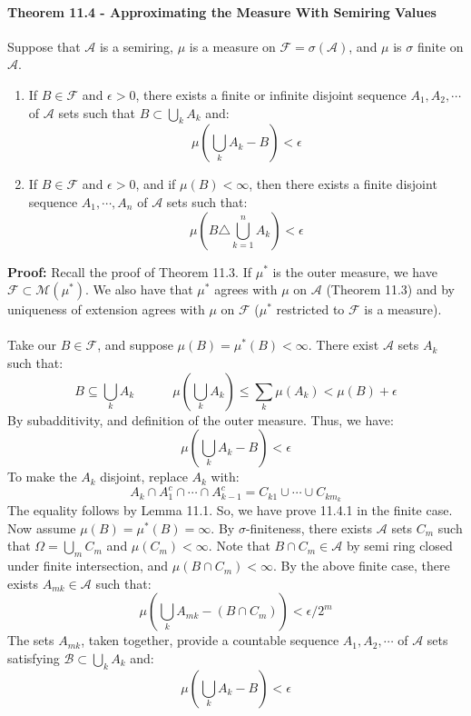 \documentclass[12pt,a4paper]{article}
\newcommand{\1}[1]{\mathbbm{1}\left\{ #1 \right\}}
\newcommand{\acal}{\mathcal{A}}
\newcommand{\fcal}{\mathcal{F}}
\newcommand{\bcal}{\mathcal{B}}
\newcommand{\mcal}{\mathcal{M}}
\begin{document}
\paragraph{Theorem 11.4 - Approximating the Measure With Semiring Values} Suppose that $\acal$ is a semiring, $\mu$ is a measure on $\fcal = \sigma(\acal)$, and $\mu$ is $\sigma$ finite on $\acal$.
\begin{enumerate}
	\item If $B \in \fcal$ and $\epsilon > 0$, there exists a finite or infinite disjoint sequence $A_1, A_2, \cdots$ of $\acal$ sets such that $B \subset \bigcup_k A_k$ and:
	$$
		\mu\left(\bigcup_k A_k - B\right) < \epsilon
	$$
	
	\item If $B \in \fcal$ and $\epsilon > 0$, and if $\mu(B) < \infty$, then there exists a finite disjoint sequence $A_1, \cdots, A_n$ of $\acal$ sets such that:
	$$
		\mu\left(B \triangle \bigcup_{k=1}^n A_k\right) < \epsilon
	$$
\end{enumerate}
\textbf{Proof:} Recall the proof of Theorem 11.3. If $\mu^*$ is the outer measure, we have $\fcal \subset \mcal(\mu^*)$. We also have that $\mu^*$ agrees with $\mu$ on $\acal$ (Theorem 11.3) and by uniqueness of extension agrees with $\mu$ on $\fcal$ ($\mu^*$ restricted to $\fcal$ is a measure).
\\\\
Take our $B \in \fcal$, and suppose $\mu(B) = \mu^*(B) < \infty$. There exist $\acal$ sets $A_k$ such that:
$$
	B \subseteq \bigcup_k A_k \quad\quad\quad
	\mu\left(\bigcup_k A_k\right) \leq \sum_k \mu(A_k) < \mu(B) + \epsilon
$$
By subadditivity, and definition of the outer measure. Thus, we have:
$$
	\mu\left(\bigcup_k A_k - B\right) < \epsilon
$$
To make the $A_k$ disjoint, replace $A_k$ with:
$$
	A_k \cap A_1^c \cap \cdots \cap A_{k-1}^c = C_{k1} \cup \cdots \cup C_{km_k}
$$
The equality follows by Lemma 11.1. So, we have prove 11.4.1 in the finite case. Now assume $\mu(B) = \mu^*(B) = \infty$. By $\sigma$-finiteness, there exists $\acal$ sets $C_m$ such that $\Omega = \bigcup_m C_m$ and $\mu(C_m) < \infty$. Note that $B \cap C_m \in \acal$ by semi ring closed under finite intersection, and $\mu(B \cap C_m) < \infty$. By the above finite case, there exists $A_{mk} \in \acal$ such that:
$$
	\mu\left(\bigcup_k A_{mk} - (B \cap C_m)\right) < \epsilon/2^m
$$
The sets $A_{mk}$, taken together, provide a countable sequence $A_1, A_2, \cdots$ of $\acal$ sets satisfying $\bcal \subset \bigcup_k A_k$ and:
$$
	\mu\left(\bigcup_k A_k - B\right) < \epsilon
$$
\end{document}
